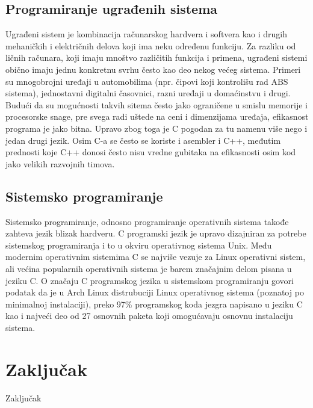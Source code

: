 \documentclass[a4paper]{article}
\begin{document}
{\subsection{Programiranje ugrađenih sistema}
Ugrađeni sistem je kombinacija računarskog hardvera i softvera kao i drugih mehaničkih i električnih
delova koji ima neku određenu funkciju. Za razliku od ličnih računara, koji imaju mnoštvo različitih funkcija i primena, ugrađeni sistemi obično imaju jednu konkretnu svrhu često kao deo nekog većeg sistema. Primeri su mnogobrojni uređaji u automobilima (npr. čipovi koji kontrolišu rad ABS sistema), jednostavni digitalni časovnici, razni uređaji u  domaćinstvu i drugi. Budući da su mogućnosti takvih sitema često jako ograničene u smislu memorije i procesorske snage, pre svega radi uštede na ceni i dimenzijama uređaja, efikasnost programa je jako bitna. Upravo zbog toga je C pogodan za tu namenu više nego i jedan drugi jezik. Osim C-a se često se koriste i asembler i C++, međutim prednosti koje C++ donosi često nisu vredne gubitaka na efikasnosti osim kod jako velikih razvojnih timova.

\subsection{Sistemsko programiranje}Sistemsko programiranje, odnosno programiranje operativnih sistema takođe zahteva jezik blizak hardveru. C programski jezik je upravo dizajniran za potrebe sistemskog programiranja i to u okviru operativnog sistema Unix. Među modernim operativnim sistemima C se najviše vezuje za Linux operativni sistem, ali većina popularnih operativnih sistema je barem značajnim delom pisana u jeziku C. O značaju C programskog jezika u sistemskom programiranju govori podatak da je u Arch Linux distrubuciji Linux operativnog sistema (poznatoj po minimalnoj instalaciji), preko 97\% programskog koda jezgra napisano u jeziku C kao i najveći deo od 27 osnovnih paketa koji omogućavaju osnovnu instalaciju sistema.

\section{Zaključak}
\label{sec:zakljucak}
Zaključak


\appendix

\iffalse


\fi

\begin{thebibliography}{9}


\end{thebibliography}}
\end{document}
